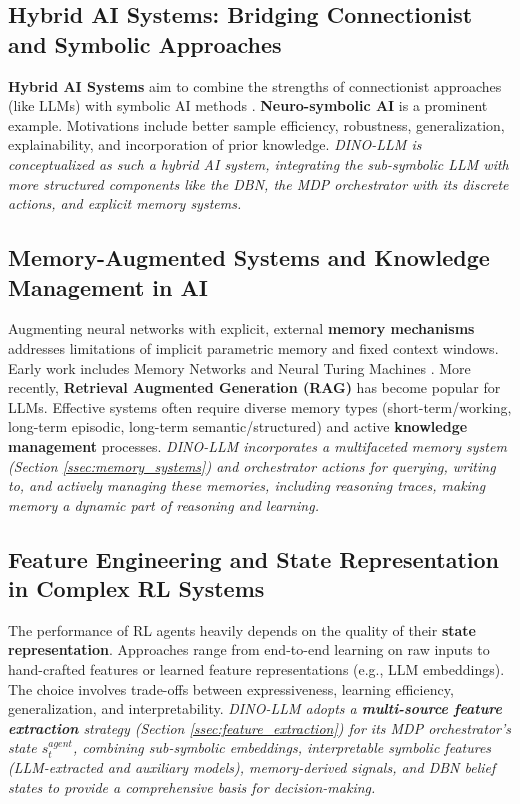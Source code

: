 \documentclass[11pt]{article}
\begin{document}
\subsection{Hybrid AI Systems: Bridging Connectionist and Symbolic Approaches}
\label{sec:rw_hybrid_ai}
\textbf{Hybrid AI Systems} aim to combine the strengths of connectionist approaches (like LLMs) with symbolic AI methods \citep{Marcus2020TheNG, Garnelo2021SurveyON}. \textbf{Neuro-symbolic AI} is a prominent example. Motivations include better sample efficiency, robustness, generalization, explainability, and incorporation of prior knowledge.
\textit{DINO-LLM is conceptualized as such a hybrid AI system, integrating the sub-symbolic LLM with more structured components like the DBN, the MDP orchestrator with its discrete actions, and explicit memory systems.}

\subsection{Memory-Augmented Systems and Knowledge Management in AI}
\label{sec:rw_memory}
Augmenting neural networks with explicit, external \textbf{memory mechanisms} addresses limitations of implicit parametric memory and fixed context windows. Early work includes Memory Networks \citep{Weston2014MemoryN, Sukhbaatar2015EndToEndMN} and Neural Turing Machines \citep{Graves2014NeuralTM}. More recently, \textbf{Retrieval Augmented Generation (RAG)} \citep{Lewis2020RetrievalAugmentedGF} has become popular for LLMs. Effective systems often require diverse memory types (short-term/working, long-term episodic, long-term semantic/structured) and active \textbf{knowledge management} processes.
\textit{DINO-LLM incorporates a multifaceted memory system (Section \ref{ssec:memory_systems}) and orchestrator actions for querying, writing to, and actively managing these memories, including reasoning traces, making memory a dynamic part of reasoning and learning.}

\subsection{Feature Engineering and State Representation in Complex RL Systems}
\label{sec:rw_feature_engineering}
The performance of RL agents heavily depends on the quality of their \textbf{state representation}. Approaches range from end-to-end learning on raw inputs \citep{Mnih2013PlayingAW} to hand-crafted features or learned feature representations (e.g., LLM embeddings). The choice involves trade-offs between expressiveness, learning efficiency, generalization, and interpretability.
\textit{DINO-LLM adopts a \textbf{multi-source feature extraction} strategy (Section \ref{ssec:feature_extraction}) for its MDP orchestrator's state $s_t^{agent}$, combining sub-symbolic embeddings, interpretable symbolic features (LLM-extracted and auxiliary models), memory-derived signals, and DBN belief states to provide a comprehensive basis for decision-making.}
\end{document}
